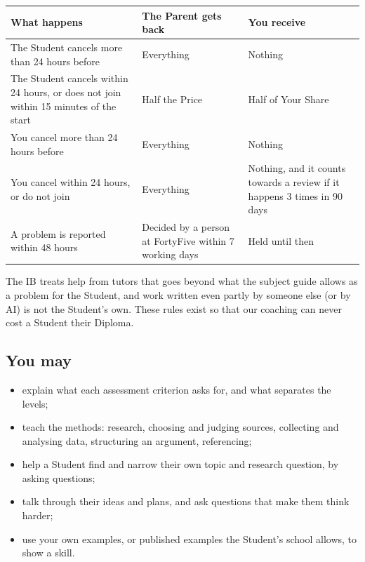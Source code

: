 \documentclass[11pt]{article}
\begin{document}
\renewcommand{\arraystretch}{1.25}
\noindent\begin{tabularx}{\linewidth}{@{}>{\raggedright\arraybackslash}X >{\raggedright\arraybackslash}X >{\raggedright\arraybackslash}X@{}}
\toprule
What happens & The Parent gets back & You receive \\
\midrule
The Student cancels more than 24 hours before & Everything & Nothing \\
The Student cancels within 24 hours, or does not join within 15 minutes of the start & Half the Price & Half of Your Share \\
You cancel more than 24 hours before & Everything & Nothing \\
You cancel within 24 hours, or do not join & Everything & Nothing, and it counts towards a review if it happens 3 times in 90 days \\
A problem is reported within 48 hours & Decided by a person at FortyFive within 7 working days & Held until then \\
\bottomrule
\end{tabularx}


The IB treats help from tutors that goes beyond what the subject guide allows as a problem for the Student, and work written even partly by someone else (or by AI) is not the Student's own. These rules exist so that our coaching can never cost a Student their Diploma.

\subsection*{You may}
\begin{itemize}
  \item explain what each assessment criterion asks for, and what separates the levels;
  \item teach the methods: research, choosing and judging sources, collecting and analysing data, structuring an argument, referencing;
  \item help a Student find and narrow their own topic and research question, by asking questions;
  \item talk through their ideas and plans, and ask questions that make them think harder;
  \item use your own examples, or published examples the Student's school allows, to show a skill.
\end{itemize}
\end{document}
